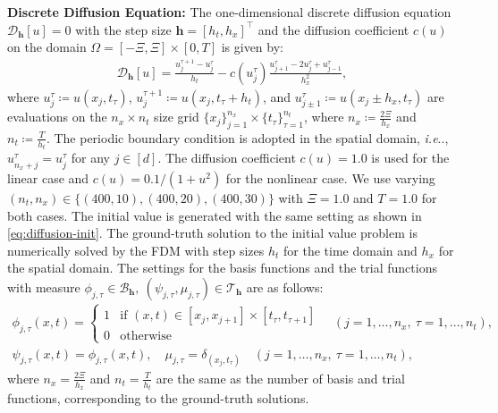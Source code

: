 \documentclass{article}
\makeatletter
\def\@onedot{\ifx\@let@token.\else.\null\fi\xspace}
\DeclareRobustCommand\onedot{\futurelet\@let@token\@onedot}
\def\ie{\emph{i.e}\onedot}
\theoremstyle{plain}
\theoremstyle{definition}
\theoremstyle{remark}
\makeatother
\begin{document}
\textbf{Discrete Diffusion Equation:}
The one-dimensional discrete diffusion equation \(\mathscr{D}_{\bm{h}}[u]=0\) with the step size \(\bm{h} = [h_t, h_x]^{\top}\) and the diffusion coefficient \(c(u)\) on the domain \(\Omega = [-\Xi, \Xi] \times [0, T]\) is given by:
\begin{align*}
    \mathscr{D}_{\bm{h}}[u] = \frac{u^{\tau+1}_{j} - u^{\tau}_{j}}{h_t} - c(u^{\tau}_{j}) \frac{u^{\tau}_{j+1} - 2u^{\tau}_{j} + u^{\tau}_{j-1}}{h_x^2},
\end{align*}
where \(u^{\tau}_j \coloneqq u(x_j, t_{\tau})\), \(u^{\tau+1}_j \coloneqq u(x_j, t_{\tau} + h_t)\), and \(u^{\tau}_{j\pm 1} \coloneqq u(x_j \pm h_x, t_{\tau})\) are evaluations on the \(n_x \times n_t\) size grid \( \{ x_j \}_{j=1}^{n_x} \times \{ t_{\tau} \}_{\tau=1}^{n_t} \), where \(n_x \coloneqq \frac{2\Xi}{h_x}\) and \(n_t \coloneqq \frac{T}{h_t}\). The periodic boundary condition is adopted in the spatial domain, \ie, \(u_{n_x + j}^{\tau} = u_{j}^{\tau}\) for any \(j \in [d]\).
The diffusion coefficient \(c(u) = 1.0\) is used for the linear case and \(c(u) = 0.1/(1 + u^2)\) for the nonlinear case. We use varying \( (n_t, n_x) \in \{ (400, 10), (400, 20), (400, 30) \}\) with \(\Xi = 1.0\) and \(T = 1.0\) for both cases. The initial value is generated with the same setting as shown in \cref{eq:diffusion-init}.
The ground-truth solution to the initial value problem is numerically solved by the FDM with step sizes \(h_t\) for the time domain and \(h_x\) for the spatial domain.
The settings for the basis functions and the trial functions with measure \(\phi_{j, \tau} \in \mathcal{B}_{\bm{h}},\ (\psi_{j, \tau}, \mu_{j, \tau}) \in \mathcal{T}_{\bm{h}}\) are as follows:
\begin{gather*}
    \phi_{j, \tau}(x, t) = \begin{cases}
    1 & \text{if } (x, t) \in [x_j, x_{j+1}] \times [t_{\tau}, t_{\tau+1}] \\
    0 & \text{otherwise}
    \end{cases} \quad (j = 1, \ldots, n_x, \ \tau = 1, \ldots, n_t), \\
    \psi_{j, \tau}(x, t) = \phi_{j, \tau}(x, t), \quad \mu_{j, \tau} = \delta_{(x_j, t_{\tau})} \quad (j = 1, \ldots, n_x, \ \tau = 1, \ldots, n_t),
\end{gather*}
where \(n_x = \frac{2\Xi}{h_x}\) and \(n_t = \frac{T}{h_t}\) are the same as the number of basis and trial functions, corresponding to the ground-truth solutions.
\end{document}
